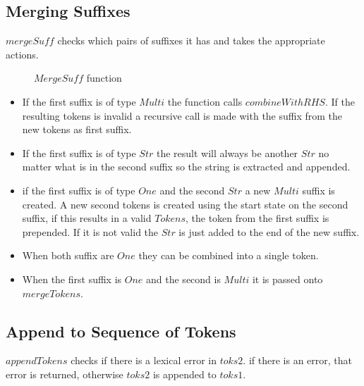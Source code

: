 \subsection{Merging Suffixes}
$mergeSuff$ checks which pairs of suffixes it has and takes the appropriate
actions.

\begin{figure}[h!]
  
  \caption{$MergeSuff$ function \label{fig:msuff}}
\end{figure}
\begin{itemize}
\item If the first suffix is of type $Multi$ the function calls
  $combineWithRHS$. If the resulting tokens is invalid a recursive call is made
  with the suffix from the new tokens as first suffix.
\item If the first suffix is of type $Str$ the result will always be another
  $Str$ no matter what is in the second suffix so the string is extracted and
  appended.
\item if the first suffix is of type $One$ and the second $Str$ a new $Multi$
  suffix is created. A new second tokens is created using the start state on the
  second suffix, if this results in a valid $Tokens$, the token from the first
  suffix is prepended. If it is not valid the $Str$ is just added to the end of
  the new suffix.
\item When both suffix are $One$ they can be combined into a single token.
\item When the first suffix is $One$ and the second is $Multi$ it is passed onto
  $mergeTokens$.
\end{itemize}
\subsection{Append to Sequence of Tokens}
$appendTokens$ checks if there is a lexical error in $toks2$. if there is
an error, that error is returned, otherwise $toks2$ is appended to $toks1$.

